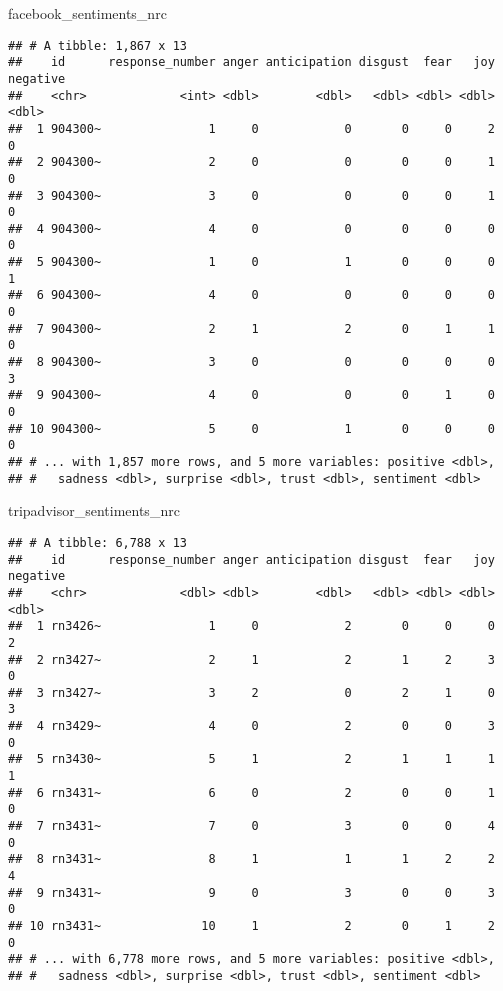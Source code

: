 \documentclass[]{article}
\newenvironment{Shaded}{\begin{snugshade}}{\end{snugshade}}
\newcommand{\NormalTok}[1]{#1}
\begin{document}
\begin{Shaded}
\begin{Highlighting}[]
\NormalTok{facebook_sentiments_nrc }
\end{Highlighting}
\end{Shaded}

\begin{verbatim}
## # A tibble: 1,867 x 13
##    id      response_number anger anticipation disgust  fear   joy negative
##    <chr>             <int> <dbl>        <dbl>   <dbl> <dbl> <dbl>    <dbl>
##  1 904300~               1     0            0       0     0     2        0
##  2 904300~               2     0            0       0     0     1        0
##  3 904300~               3     0            0       0     0     1        0
##  4 904300~               4     0            0       0     0     0        0
##  5 904300~               1     0            1       0     0     0        1
##  6 904300~               4     0            0       0     0     0        0
##  7 904300~               2     1            2       0     1     1        0
##  8 904300~               3     0            0       0     0     0        3
##  9 904300~               4     0            0       0     1     0        0
## 10 904300~               5     0            1       0     0     0        0
## # ... with 1,857 more rows, and 5 more variables: positive <dbl>,
## #   sadness <dbl>, surprise <dbl>, trust <dbl>, sentiment <dbl>
\end{verbatim}

\begin{Shaded}
\begin{Highlighting}[]
\NormalTok{tripadvisor_sentiments_nrc }
\end{Highlighting}
\end{Shaded}

\begin{verbatim}
## # A tibble: 6,788 x 13
##    id      response_number anger anticipation disgust  fear   joy negative
##    <chr>             <dbl> <dbl>        <dbl>   <dbl> <dbl> <dbl>    <dbl>
##  1 rn3426~               1     0            2       0     0     0        2
##  2 rn3427~               2     1            2       1     2     3        0
##  3 rn3427~               3     2            0       2     1     0        3
##  4 rn3429~               4     0            2       0     0     3        0
##  5 rn3430~               5     1            2       1     1     1        1
##  6 rn3431~               6     0            2       0     0     1        0
##  7 rn3431~               7     0            3       0     0     4        0
##  8 rn3431~               8     1            1       1     2     2        4
##  9 rn3431~               9     0            3       0     0     3        0
## 10 rn3431~              10     1            2       0     1     2        0
## # ... with 6,778 more rows, and 5 more variables: positive <dbl>,
## #   sadness <dbl>, surprise <dbl>, trust <dbl>, sentiment <dbl>
\end{verbatim}
\end{document}

